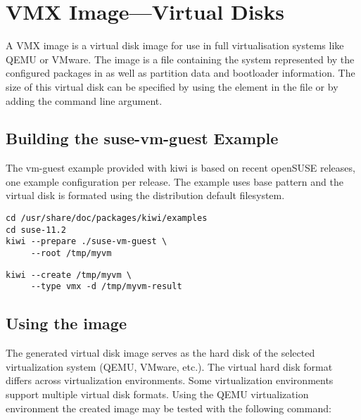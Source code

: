 \chapter{VMX Image---Virtual Disks}
\label{chapter:vmx}
\minitoc

A VMX image is a virtual disk image for use in full virtualisation
systems like QEMU or VMware. The image is a file containing the
system represented by the configured packages in  as well
as partition data and bootloader information. The size of
this virtual disk can be specified by using the  element
in the  file or by adding the  command
line argument.

\section{Building the suse-vm-guest Example}

The vm-guest example provided with kiwi is based on recent openSUSE releases,
one example configuration per release. The example uses base pattern and the
virtual disk is formated using the distribution default filesystem.

\begin{Command}{12cm}
\begin{verbatim}
cd /usr/share/doc/packages/kiwi/examples
cd suse-11.2
kiwi --prepare ./suse-vm-guest \
     --root /tmp/myvm
\end{verbatim}
\end{Command}

\begin{Command}{12cm}
\begin{verbatim}
kiwi --create /tmp/myvm \
     --type vmx -d /tmp/myvm-result
\end{verbatim}
\end{Command}

\section{Using the image}

The generated virtual disk image serves as the hard disk of the selected
virtualization system (QEMU, VMware, etc.). The virtual hard disk format 
differs across virtualization environments. Some virtualization environments
support multiple virtual disk formats. Using the QEMU virtualization 
environment the created image may be tested with the following command:

